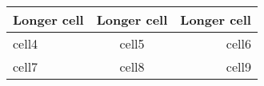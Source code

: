\begin{tabular}{ |l|c|r| }
	\hline
	Longer cell & Longer cell & Longer cell \\
	\hline
	cell4 & cell5 & cell6 \\
	cell7 & cell8 & cell9 \\
	\hline
\end{tabular}
